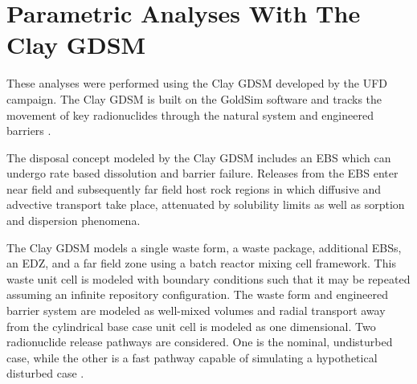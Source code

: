 
\section{Parametric Analyses With The Clay GDSM}

These analyses were performed using the Clay \gls{GDSM} developed by the 
\gls{UFD} campaign\cite{clayton_generic_2011}. The Clay \gls{GDSM} is built on the 
GoldSim software and tracks the movement of key radionuclides through the 
natural system and engineered barriers \cite{golder_associates_goldsim_2010, 
golder_associates_goldsim_2010-1}.

The disposal concept modeled by the Clay \gls{GDSM} includes an \gls{EBS} which 
can undergo rate based dissolution and barrier failure. Releases from the \gls{EBS} enter 
near field and subsequently far field host rock regions in which diffusive and 
advective transport take place, attenuated by solubility limits as well as 
sorption and dispersion phenomena.  

The Clay \gls{GDSM} models a single waste form, a waste package, additional 
\glspl{EBS}, 
an \gls{EDZ}, and a far field zone using a batch reactor mixing cell framework. This waste unit cell is modeled 
with boundary conditions such that it may be repeated assuming an infinite 
repository configuration. The waste form and engineered barrier system are modeled as well-mixed volumes 
and radial transport away from the cylindrical base case unit cell is modeled as  
one dimensional. Two radionuclide release pathways are considered. One is the nominal, 
undisturbed case, while the other is a fast pathway capable of simulating a 
hypothetical disturbed case 
\cite{clayton_generic_2011}.

